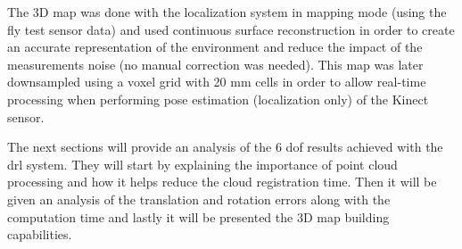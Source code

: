 The 3D map was done with the localization system in mapping mode (using the fly test sensor data) and used continuous surface reconstruction in order to create an accurate representation of the environment and reduce the impact of the measurements noise (no manual correction was needed). This map was later downsampled using a voxel grid with 20 mm cells in order to allow real-time processing when performing pose estimation (localization only) of the Kinect sensor.

The next sections will provide an analysis of the 6 \gls{dof} results achieved with the \gls{drl} system. They will start by explaining the importance of point cloud processing and how it helps reduce the cloud registration time. Then it will be given an analysis of the translation and rotation errors along with the computation time and lastly it will be presented the 3D map building capabilities.



